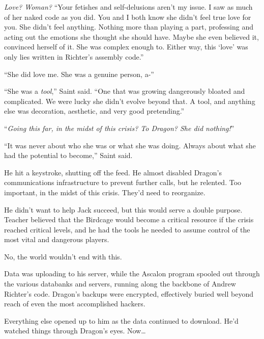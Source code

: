 \emph{Love?  Woman?  }``Your fetishes and self-delusions aren't my issue.  I saw as much of her naked code as you did.  You and I both know she didn't feel true love for you.  She didn't feel anything.  Nothing more than playing a part, professing and acting out the emotions she thought she should have.  Maybe she even believed it, convinced herself of it.  She was complex enough to.  Either way, this `love' was only lies written in Richter's assembly code.''



``She did love me.  She was a genuine person, a-''



``She was a \emph{tool},'' Saint said.  ``One that was growing dangerously bloated and complicated.  We were lucky she didn't evolve beyond that.  A tool, and anything else was decoration, aesthetic, and very good pretending.''



``\emph{Going this far, in the midst of this crisis?  To Dragon?  She did nothing!}''



``It was never about who she was or what she was doing.  Always about what she had the potential to become,'' Saint said.



He hit a keystroke, shutting off the feed.  He almost disabled Dragon's communications infrastructure to prevent further calls, but he relented.  Too important, in the midst of this crisis.  They'd need to reorganize.



He didn't want to help Jack succeed, but this would serve a double purpose.  Teacher believed that the Birdcage would become a critical resource if the crisis reached critical levels, and he had the tools he needed to assume control of the most vital and dangerous players.



No, the world wouldn't end with this.



Data was uploading to his server, while the Ascalon program spooled out through the various databanks and servers, running along the backbone of Andrew Richter's code.  Dragon's backups were encrypted, effectively buried well beyond reach of even the most accomplished hackers.



Everything else opened up to him as the data continued to download.  He'd watched things through Dragon's eyes.  Now\ldots



